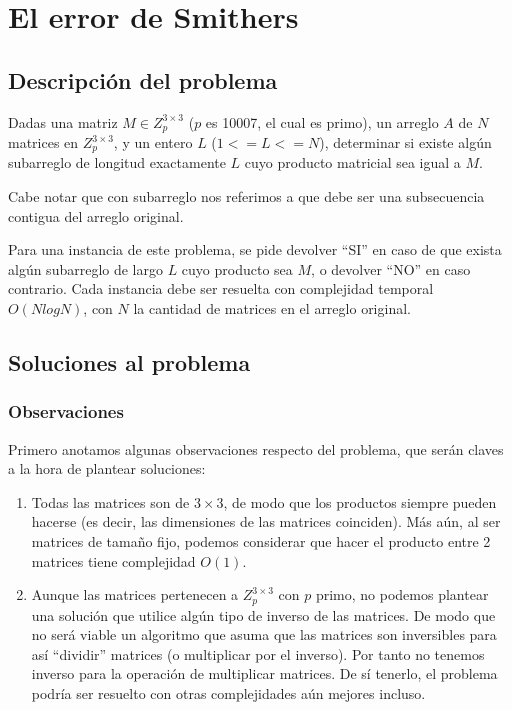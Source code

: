 \newpage{}
\section{El error de Smithers}
\subsection{Descripción del problema}
Dadas una matriz $M\in Z_p^{3 \times 3}$ ($p$ es 10007, el cual es primo), un arreglo 
$A$ de $N$ matrices en $Z_p^{3 \times 3}$, 
y un entero $L$ ($1 <= L <= N$), determinar si existe algún subarreglo 
de longitud exactamente $L$ cuyo producto matricial 
sea igual a $M$. 

Cabe notar que con subarreglo nos referimos a que debe ser una 
subsecuencia contigua del arreglo original. 

Para una instancia de este problema, se pide devolver ``SI'' en 
caso de que exista algún subarreglo de largo $L$ cuyo producto sea $M$, o devolver 
``NO'' en caso contrario. Cada instancia debe ser resuelta con complejidad temporal 
$O(N log N)$, con $N$ 
la cantidad de matrices en el arreglo original. 

\subsection{Soluciones al problema}
\subsubsection{Observaciones}

Primero anotamos algunas observaciones respecto del problema, que serán claves a la
hora de plantear soluciones: 
\begin{enumerate}
    \item Todas las matrices son de $3 \times 3$, de modo que los productos siempre pueden 
    hacerse (es decir, las dimensiones de las matrices coinciden). Más aún, al ser matrices 
    de tamaño fijo, podemos considerar que hacer el producto entre 2 matrices tiene 
    complejidad $O(1)$. 
    \item Aunque las matrices pertenecen a $Z_p^{3 \times 3}$ con $p$ primo, 
    no podemos plantear una solución que utilice algún tipo de inverso de las matrices. 
    De modo que no será viable un algoritmo que asuma que las matrices son inversibles para 
    así ``dividir'' matrices (o multiplicar por el inverso). Por tanto no tenemos inverso para la 
    operación de multiplicar matrices. De sí tenerlo, el problema podría ser resuelto con 
    otras complejidades aún mejores incluso. 
\end{enumerate}

